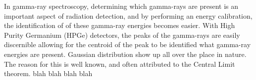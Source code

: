 In gamma-ray spectroscopy, determining which gamma-rays are present is an important aspect of
radiation detection, and by performing an energy calibration, the identification of
of these gamma-ray energies becomes easier. With High Purity Germanium (HPGe) detectors, the peaks of the gamma-rays
are easily discernible allowing for the centroid of the peak to be identified  
what gamma-ray energies are present.
Gaussian distribution show up all over the place in nature.
The reason for this is well known,
and often attributed to the Central Limit theorem. blah blah blah blah
\cite{clt} \cite{clt2}
